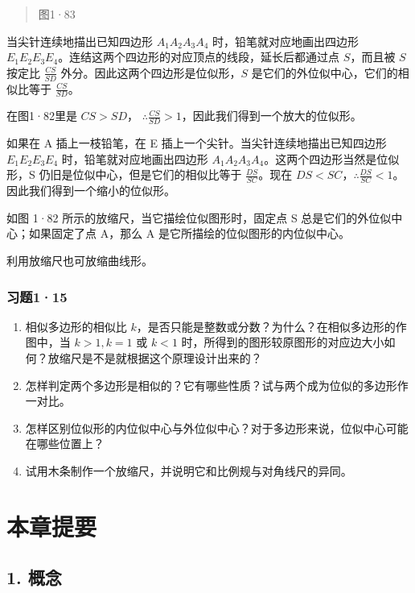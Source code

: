 \begin{quote}
图1·83
\end{quote}

当尖针连续地描出已知四边形 \(A_{1}A_{2}A_{3}A_{4}\)
时，铅笔就对应地画出四边形
\(E_{1}E_{2}E_{3}E_{4}\)。连结这两个四边形的对应顶点的线段，延长后都通过点
\(S\)，而且被 \(S\) 按定比 \(\frac{CS}{SD}\)
外分。因此这两个四边形是位似形，\(S\)
是它们的外位似中心，它们的相似比等于 \(\frac{CS}{SD}\)。

在图1·82里是 \(CS > SD\)，
\(\therefore \frac{CS}{SD} > 1\)，因此我们得到一个放大的位似形。

如果在 A 插上一枝铅笔，在 E 插上一个尖针。当尖针连续地描出已知四边形
\(E_{1}E_{2}E_{3}E_{4}\) 时，铅笔就对应地画出四边形
\(A_{1}A_{2}A_{3}A_{4}\)。这两个四边形当然是位似形，S
仍旧是位似中心，但是它们的相似比等于 \(\frac{DS}{SC}\)。现在
\(DS < SC\)，\(\therefore \frac{DS}{SC} < 1\)。因此我们得到一个缩小的位似形。

如图 1·82 所示的放缩尺，当它描绘位似图形时，固定点 S
总是它们的外位似中心；如果固定了点 A，那么 A
是它所描绘的位似图形的内位似中心。

利用放缩尺也可放缩曲线形。

\subsubsection{习题1·15}

\begin{enumerate}
\item
  相似多边形的相似比
  \(k\)，是否只能是整数或分数？为什么？在相似多边形的作图中，当
  \(k > 1, k = 1\) 或 \(k < 1\)
  时，所得到的图形较原图形的对应边大小如何？放缩尺是不是就根据这个原理设计出来的？
\item
  怎样判定两个多边形是相似的？它有哪些性质？试与两个成为位似的多边形作一对比。
\item
  怎样区别位似形的内位似中心与外位似中心？对于多边形来说，位似中心可能在哪些位置上？
\item
  试用木条制作一个放缩尺，并说明它和比例规与对角线尺的异同。
\end{enumerate}

\section{本章提要}

\subsection{1. 概念}

